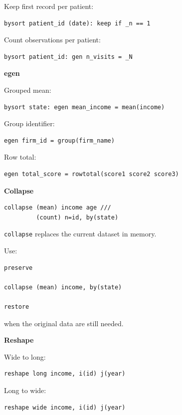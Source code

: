 \documentclass[11pt,letterpaper]{article}
\begin{document}
Keep first record per patient:

\begin{lstlisting}
bysort patient_id (date): keep if _n == 1
\end{lstlisting}

Count observations per patient:

\begin{lstlisting}
bysort patient_id: gen n_visits = _N
\end{lstlisting}

\textbf{egen}

Grouped mean:

\begin{lstlisting}
bysort state: egen mean_income = mean(income)
\end{lstlisting}

Group identifier:

\begin{lstlisting}
egen firm_id = group(firm_name)
\end{lstlisting}

Row total:

\begin{lstlisting}
egen total_score = rowtotal(score1 score2 score3)
\end{lstlisting}

\textbf{Collapse}

\begin{lstlisting}
collapse (mean) income age ///
         (count) n=id, by(state)
\end{lstlisting}

\texttt{collapse} replaces the current dataset in memory.

Use:

\begin{lstlisting}
preserve

collapse (mean) income, by(state)

restore
\end{lstlisting}

when the original data are still needed.

\textbf{Reshape}

Wide to long:

\begin{lstlisting}
reshape long income, i(id) j(year)
\end{lstlisting}

Long to wide:

\begin{lstlisting}
reshape wide income, i(id) j(year)
\end{lstlisting}
\end{document}
